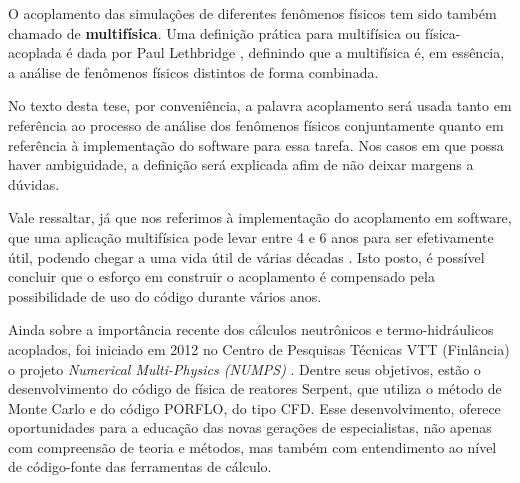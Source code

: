O acoplamento das simulações de diferentes fenômenos físicos tem sido também chamado de
\textbf{multifísica}. 
Uma definição prática para multifísica ou física-acoplada é dada por Paul Lethbridge \cite{Lethbridge2005}, definindo que 
a multifísica é, em essência, a análise de fenômenos físicos distintos de forma combinada.

No texto desta tese, 
por conveniência, a palavra acoplamento será usada tanto em referência ao processo de análise dos fenômenos físicos conjuntamente 
quanto em referência à implementação do software para essa tarefa. Nos casos em que possa haver ambiguidade, 
a definição será explicada afim de não deixar margens a dúvidas.

Vale ressaltar, já que nos referimos à implementação do acoplamento em software, que uma aplicação multifísica 
pode levar entre 4 e 6 anos para ser efetivamente útil, podendo chegar a uma vida útil de várias décadas 
\cite{Graham2004}. Isto posto, é possível concluir que o esforço em construir o acoplamento é compensado 
pela possibilidade de uso do código durante vários anos.

Ainda sobre a importância recente dos cálculos neutrônicos e termo-hidráulicos acoplados, foi iniciado em 2012
no Centro de Pesquisas Técnicas VTT (Finlância) o projeto \textit{Numerical Multi-Physics (NUMPS)} \cite{Leppanen2015}.
Dentre seus objetivos, estão o desenvolvimento do código de física de reatores Serpent, que utiliza o método de
Monte Carlo e do código PORFLO, do tipo CFD. Esse desenvolvimento, oferece oportunidades para a educação das novas
gerações de especialistas, não apenas com compreensão de teoria e métodos, mas também com entendimento ao nível de
código-fonte das ferramentas de cálculo.

